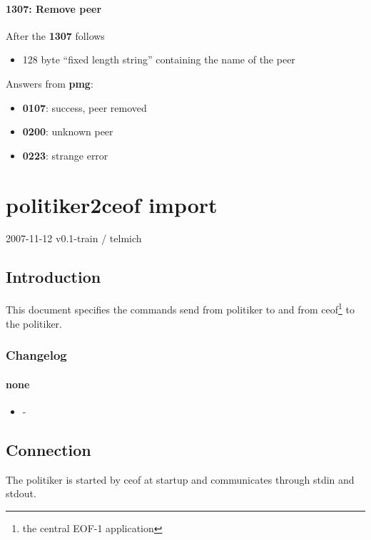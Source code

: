 \documentclass[12pt,a4paper]{book}
\begin{document}
\subsubsection{1307: Remove peer}
After the \textbf{1307} follows
\begin{itemize}
\item 128 byte "`fixed length string"' containing the name of the peer
\end{itemize}
Answers from \textbf{pmg}:
\begin{itemize}
\item \textbf{0107}: success, peer removed
\item \textbf{0200}: unknown peer
\item \textbf{0223}: strange error
\end{itemize}
\chapter{politiker2ceof import}

2007-11-12 v0.1-train / telmich

\section{Introduction}
This document specifies the commands send from politiker to and from
ceof\footnote{the central EOF-1 application} to the politiker.

\subsection{Changelog}
\subsubsection{none}
\begin{itemize}
\item -
\end{itemize}
\section{Connection}
The politiker is started by ceof at startup and communicates through stdin
and stdout.
\end{document}
